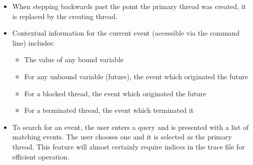 \documentclass{article}[12pt]
\begin{document}
\begin{itemize}
\item When stepping backwards past the point the primary thread was created, it is replaced by the creating thread.
\item Contextual information for the current event (accessible via the command line) includes:
	\begin{itemize}
	\item The value of any bound variable
	\item For any unbound variable (future), the event which originated the future
	\item For a blocked thread, the event which originated the future
	\item For a terminated thread, the event which terminated it
	\end{itemize}
\item To search for an event, the user enters a query and is presented with a
list of matching events. The user chooses one and it is selected as the primary
thread. This feature will almost certainly require indices in the trace file
for efficient operation.
\end{itemize}
\end{document}
